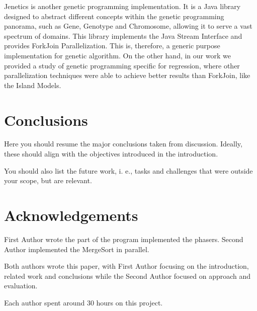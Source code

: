 \documentclass[runningheads]{llncs}
\begin{document}
Jenetics \cite{jenetics} is another genetic programming implementation. It is a Java library designed to abstract different concepts within the genetic programming panorama, such as Gene, Genotype and Chromosome, allowing it to serve a vast spectrum of domains. This library implements the Java Stream Interface and provides ForkJoin Parallelization. This is, therefore, a generic purpose implementation for genetic algorithm. On the other hand, in our work we provided a study of genetic programming specific for regression, where other parallelization techniques were able to achieve better results than ForkJoin, like the Island Models.

\section{Conclusions}

Here you should resume the major conclusions taken from discussion. Ideally, these should align with the objectives introduced in the introduction.


You should also list the future work, i. e., tasks and challenges that were outside your scope, but are relevant.

\section*{Acknowledgements}

First Author wrote the part of the program implemented the phasers. Second Author implemented the MergeSort in parallel. 

Both authors wrote this paper, with First Author focusing on the introduction, related work and conclusions while the Second Author focused on approach and evaluation.

Each author spent around 30 hours on this project.



\end{document}
